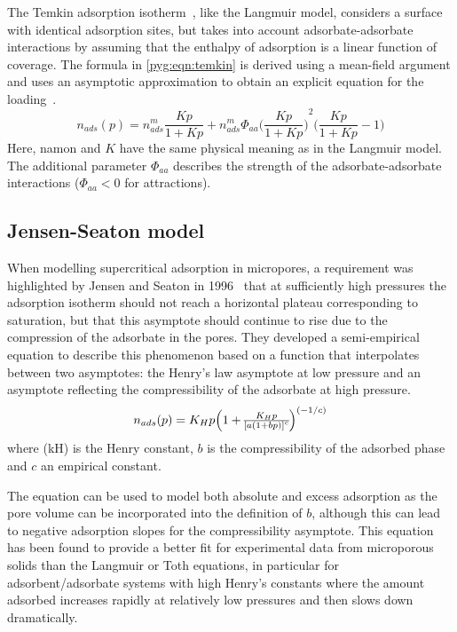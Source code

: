 The Temkin adsorption
isotherm~\cite{temkinKineticsAmmoniaSynthesis1940},
like the Langmuir model, considers
a surface with identical adsorption sites, but takes into
account adsorbate-adsorbate interactions by assuming that the
enthalpy of adsorption is a linear function of coverage.
The formula in \autoref{pyg:eqn:temkin} is derived
using a mean-field argument and uses an asymptotic approximation
to obtain an explicit equation for the
loading~\cite{simonOptimizingNanoporousMaterials2014}.
%
\begin{equation}\label{pyg:eqn:temkin}
	n_{ads}(p) = n_{ads}^m \frac{Kp}{1+Kp} + n_{ads}^m \Phi_{aa}
	{\Big(\frac{Kp}{1+Kp}\Big)}^2 \Big(\frac{Kp}{1+Kp} -1\Big)
\end{equation}
%
Here, \gls{namon} and \(K\) have the same physical meaning as in the
Langmuir model.
The additional parameter \(\Phi_{aa}\) describes the strength of the
adsorbate-adsorbate
interactions (\(\Phi_{aa} < 0\) for attractions).

\subsection{Jensen-Seaton model}\label{pyg:models:jseaton}

When modelling supercritical adsorption in micropores, a requirement was
highlighted by
Jensen and Seaton in 1996~\cite{jensenIsothermEquationAdsorption1996}
that at sufficiently high pressures the adsorption
isotherm should not reach a horizontal plateau corresponding to
saturation, but that this asymptote should continue to rise due to
the compression of the adsorbate in the pores. They developed a
semi-empirical equation to describe this phenomenon based on a function
that interpolates between two asymptotes: the Henry’s law asymptote at
low pressure and an asymptote reflecting the compressibility of
the adsorbate at high pressure.
%
\begin{equation}\label{pyg:eqn:jseaton}
	n_{ads}(p) = K_H p \Big{(1 + \frac{K_H p}{{[a {(1 + b
									p)}]}^c}\Big)}^{(-1/c)}
\end{equation}
%
where (\gls{kH}) is the Henry constant, \(b\) is the compressibility of
the adsorbed phase and \(c\) an empirical constant.

The equation can be used to model both absolute and excess adsorption
as the pore volume can be incorporated into the definition of \(b\),
although this can lead to negative adsorption slopes for the
compressibility asymptote. This equation has been found to provide a
better fit for experimental data from microporous solids than the
Langmuir or Toth equations, in particular for
adsorbent/adsorbate systems with high Henry’s constants where the
amount adsorbed increases rapidly at relatively low pressures and
then slows down dramatically.

